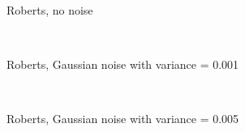 \begin{figure}
  \centering
     \\
  \caption{Roberts, no noise}
  \label{fig:robert_no_noise}
\end{figure}

\begin{figure}
  \centering
     \\
  \caption{Roberts, Gaussian noise with variance = 0.001}
  \label{fig:robert_001}
\end{figure}

\begin{figure}
  \centering
     \\
  \caption{Roberts, Gaussian noise with variance = 0.005}
  \label{fig:robert_005}
\end{figure}